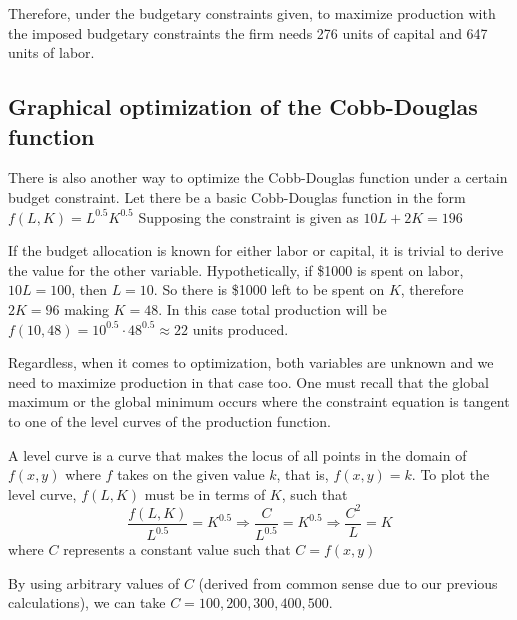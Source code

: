 \documentclass[a4paper,12pt]{article}
\theoremstyle{definition}
\begin{document}
Therefore, under the budgetary constraints given, to maximize production with the imposed budgetary constraints the firm needs 276 units of capital and 647 units of labor.


\subsection{Graphical optimization of the Cobb-Douglas function}
There is also another way to optimize the Cobb-Douglas function under a certain budget constraint. Let there be a basic Cobb-Douglas function in the form $f(L,K)=L^{0.5}K^{0.5}$ Supposing the constraint is given as $10L+2K = 196 $


If the budget allocation is known for either labor or capital, it is trivial to derive the value for the other variable. Hypothetically, if \$1000 is spent on labor, $10L=100$, then $L=10$. So there is \$1000 left to be spent on $K$, therefore $2K=96$ making $K=48$. In this case total production will be $f(10,48)=10^{0.5} \cdot 48^{0.5} \approx 22 $ units produced.

Regardless, when it comes to optimization,  both variables are unknown and we need to maximize production in that case too. One must recall that the global maximum or the global minimum occurs where the constraint equation is tangent to one of the level curves of the production function. 

A level curve is a curve that makes the locus of all points in the domain of $f(x,y)$ where $f$ takes on the given value $k$, that is, $f(x,y)=k$. To plot the level curve, $f(L,K)$ must be in terms of $K$, such that 
\begin{equation}
	\frac{f(L,K)}{L^{0.5}} = K^{0.5} \Rightarrow \frac{C}{L^{0.5}}=K^{0.5} \Rightarrow \frac{C^2}{L}=K
\end{equation}
where $C$ represents a constant value such that $C = f(x,y)$

By using arbitrary values of $C$ (derived from common sense due to our previous calculations), we can take $C=100,200,300,400,500$.
\end{document}
